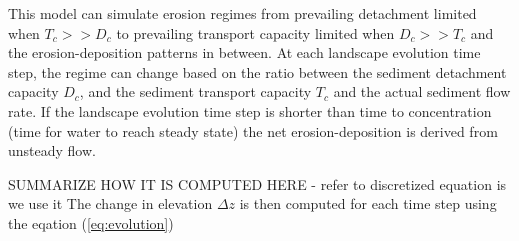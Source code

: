 \documentclass[gmd, manuscript]{copernicus}
\begin{document}


This model can simulate erosion regimes from prevailing detachment limited when $T_c >> D_c$ 
to prevailing transport capacity limited when $D_c >> T_c$ and the erosion-deposition patterns in between.
At each landscape evolution time step, the regime can change
based on 
the ratio between the sediment detachment capacity $D_c$,
and the sediment transport capacity $T_c$ and the actual sediment flow rate.
If the landscape evolution time step is shorter than time to concentration (time for water to reach steady state)
the net erosion-deposition is derived from unsteady flow.

SUMMARIZE HOW IT IS COMPUTED HERE - refer to discretized equation is we use it
The change in elevation $\Delta z$ is then computed for each time step using the eqation (\ref{eq:evolution})
\end{document}

